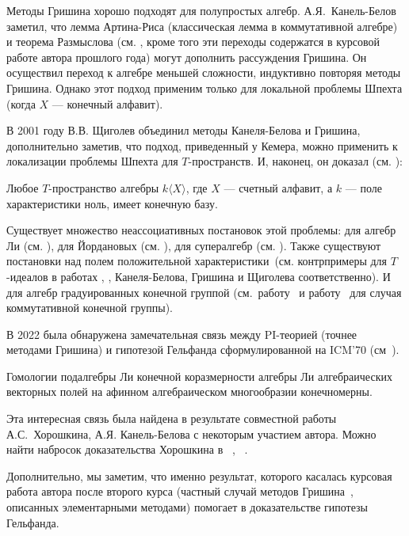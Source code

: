 Методы Гришина хорошо подходят для полупростых алгебр.
А.Я.\ Канель-Белов заметил, что лемма Артина-Риса (классическая лемма в коммутативной алгебре) и теорема Размыслова (см. \cite{GrishinSchigolev},  кроме того эти переходы содержатся в курсовой работе автора прошлого года) могут дополнить рассуждения Гришина.
Он осуществил переход к алгебре меньшей сложности, индуктивно повторяя методы Гришина.
Однако этот подход применим только для локальной проблемы Шпехта (когда $X$ — конечный алфавит).

В 2001 году В.В. Щиголев объединил методы Канеля-Белова и Гришина, дополнительно заметив, что подход, приведенный у Кемера, можно применить к локализации проблемы Шпехта для $T$-пространств.
И, наконец, он доказал (см. \cite{Shchigolev}):
\vskip 0.1in\noindent
\begin{theorem*} [В.В. Щиголев, 2001]
    Любое $T$-пространство алгебры $k\langle X\rangle$, где $X$ — счетный алфавит, а $k$ — поле характеристики ноль, имеет конечную базу.
\end{theorem*}
\vskip 0.1in\noindent

Существует множество неассоциативных постановок этой проблемы: для алгебр Ли (см. \cite{Lie}), для Йордановых (см. \cite{Jordan}), для супералгебр (см. \cite{Super}).
Также существуют постановки над полем положительной характеристики\ (см. контрпримеры для $T$-идеалов в работах \cite{ConterKanel}, \cite{ConterGrishin}, \cite{ConterShchigolev} Канеля-Белова, Гришина и Щиголева соответственно).
И для алгебр градуированных конечной группой (см.\ работу~\cite{GradedKanel} и работу~\cite{GradedSviridova} для случая коммутативной конечной группы).

В 2022 была обнаружена замечательная связь между PI-теорией (точнее методами Гришина) и гипотезой Гельфанда сформулированной на ICM’70 (см\ \cite{Gelfand}).
\vskip 0.1in\noindent
\begin{conjecture}[Гельфанд, 1970]
    \label{Gelfand}
    Гомологии подалгебры Ли конечной коразмерности алгебры Ли алгебраических векторных полей на афинном алгебраическом многообразии конечномерны.
\end{conjecture}
\vskip 0.1in\noindent
Эта интересная связь была найдена в результате совместной работы А.С.\ Хорошкина, А.Я. Канель-Белова с некоторым участием автора.
Можно найти набросок доказательства Хорошкина в ~\cite{Feigin-Kanel-Khoroshkin}, ~\cite{Centrone-Kanel-Khoroshkin-Vorobiov}.

Дополнительно, мы заметим, что именно результат, которого касалась курсовая работа автора после второго курса (частный случай методов Гришина\ \cite{Grishin}, описанных элементарными методами) помогает в доказательстве гипотезы Гельфанда.